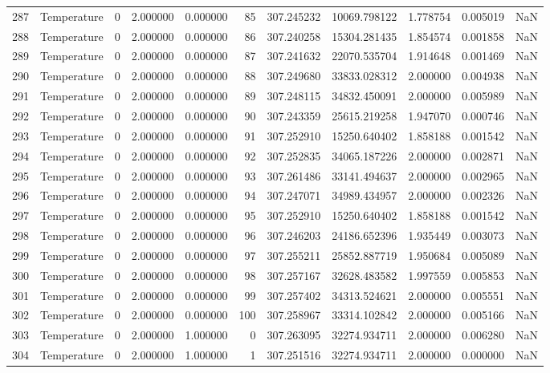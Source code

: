 \begin{tabular}{llrrrrrrrrr}
287 & Temperature & 0 & 2.000000 & 0.000000 & 85 & 307.245232 & 10069.798122 & 1.778754 & 0.005019 & NaN \\
288 & Temperature & 0 & 2.000000 & 0.000000 & 86 & 307.240258 & 15304.281435 & 1.854574 & 0.001858 & NaN \\
289 & Temperature & 0 & 2.000000 & 0.000000 & 87 & 307.241632 & 22070.535704 & 1.914648 & 0.001469 & NaN \\
290 & Temperature & 0 & 2.000000 & 0.000000 & 88 & 307.249680 & 33833.028312 & 2.000000 & 0.004938 & NaN \\
291 & Temperature & 0 & 2.000000 & 0.000000 & 89 & 307.248115 & 34832.450091 & 2.000000 & 0.005989 & NaN \\
292 & Temperature & 0 & 2.000000 & 0.000000 & 90 & 307.243359 & 25615.219258 & 1.947070 & 0.000746 & NaN \\
293 & Temperature & 0 & 2.000000 & 0.000000 & 91 & 307.252910 & 15250.640402 & 1.858188 & 0.001542 & NaN \\
294 & Temperature & 0 & 2.000000 & 0.000000 & 92 & 307.252835 & 34065.187226 & 2.000000 & 0.002871 & NaN \\
295 & Temperature & 0 & 2.000000 & 0.000000 & 93 & 307.261486 & 33141.494637 & 2.000000 & 0.002965 & NaN \\
296 & Temperature & 0 & 2.000000 & 0.000000 & 94 & 307.247071 & 34989.434957 & 2.000000 & 0.002326 & NaN \\
297 & Temperature & 0 & 2.000000 & 0.000000 & 95 & 307.252910 & 15250.640402 & 1.858188 & 0.001542 & NaN \\
298 & Temperature & 0 & 2.000000 & 0.000000 & 96 & 307.246203 & 24186.652396 & 1.935449 & 0.003073 & NaN \\
299 & Temperature & 0 & 2.000000 & 0.000000 & 97 & 307.255211 & 25852.887719 & 1.950684 & 0.005089 & NaN \\
300 & Temperature & 0 & 2.000000 & 0.000000 & 98 & 307.257167 & 32628.483582 & 1.997559 & 0.005853 & NaN \\
301 & Temperature & 0 & 2.000000 & 0.000000 & 99 & 307.257402 & 34313.524621 & 2.000000 & 0.005551 & NaN \\
302 & Temperature & 0 & 2.000000 & 0.000000 & 100 & 307.258967 & 33314.102842 & 2.000000 & 0.005166 & NaN \\
303 & Temperature & 0 & 2.000000 & 1.000000 & 0 & 307.263095 & 32274.934711 & 2.000000 & 0.006280 & NaN \\
304 & Temperature & 0 & 2.000000 & 1.000000 & 1 & 307.251516 & 32274.934711 & 2.000000 & 0.000000 & NaN \\

\end{tabular}
